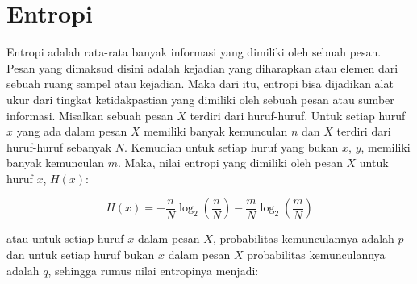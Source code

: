 \section{Entropi}
Entropi adalah rata-rata banyak informasi yang dimiliki oleh sebuah pesan. Pesan yang dimaksud disini adalah kejadian yang diharapkan atau elemen dari sebuah ruang sampel atau kejadian. Maka dari itu, entropi bisa dijadikan alat ukur dari tingkat ketidakpastian yang dimiliki oleh sebuah pesan atau sumber informasi. Misalkan sebuah pesan \begin{math}X\end{math} terdiri dari huruf-huruf. Untuk setiap huruf \begin{math}x\end{math} yang ada dalam pesan \begin{math}X\end{math} memiliki banyak kemunculan \begin{math}n\end{math} dan \begin{math}X\end{math} terdiri dari huruf-huruf sebanyak \begin{math}N\end{math}. Kemudian untuk setiap huruf yang bukan \begin{math}x\end{math}, \begin{math}y\end{math}, memiliki banyak kemunculan \begin{math}m\end{math}. Maka, nilai entropi yang dimiliki oleh pesan \begin{math}X\end{math} untuk huruf \begin{math}x\end{math}, \begin{math}H(x)\end{math}:

\begin{displaymath}
	H(x) = -\frac{n}{N}\log_2 (\frac{n}{N}) - \frac{m}{N}\log_2 (\frac{m}{N}) 
\end{displaymath}

\noindent atau untuk setiap huruf \begin{math}x\end{math} dalam pesan \begin{math}X\end{math}, probabilitas kemunculannya adalah \begin{math}p\end{math} dan untuk setiap huruf bukan \begin{math}x\end{math} dalam pesan \begin{math}X\end{math} probabilitas kemunculannya adalah \begin{math}q\end{math}, sehingga rumus nilai entropinya menjadi:


